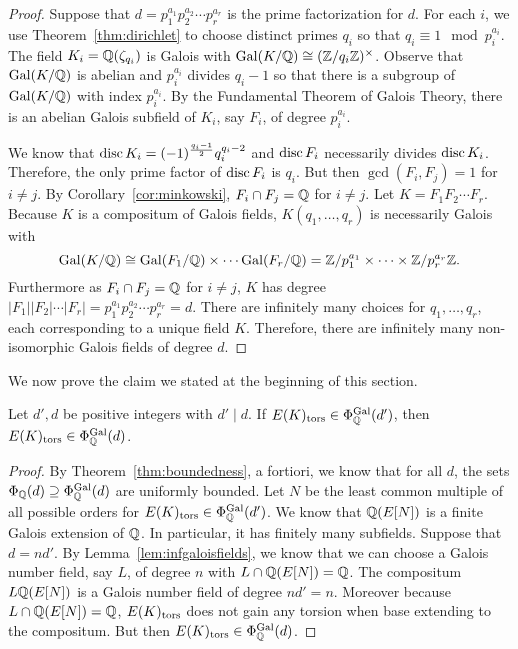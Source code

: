 \begin{proof}
Suppose that $d= p_1^{a_1}p_2^{a_2} \cdots p_r^{a_r}$ is the prime factorization for $d$. For each $i$, we use Theorem~\ref{thm:dirichlet} to choose distinct primes $q_i$ so that $q_i \equiv 1 \mod p_i^{a_i}$. The field $K_i= \mathbb{Q}(\zeta_{q_i})$ is Galois with $\operatorname{Gal}(K/\mathbb{Q}) \cong (\mathbb{Z}/q_i\mathbb{Z})^\times$. Observe that $\operatorname{Gal}(K/\mathbb{Q})$ is abelian and $p_i^{a_i}$ divides $q_i - 1$ so that there is a subgroup of $\operatorname{Gal}(K/\mathbb{Q})$ with index $p_i^{a_i}$. By the Fundamental Theorem of Galois Theory, there is an abelian Galois subfield of $K_i$, say $F_i$, of degree $p_i^{a_i}$. 

We know that $\operatorname{disc} K_i= (-1)^{\frac{q_i-1}{2}} q_i^{q_i - 2}$ and $\operatorname{disc} F_i$ necessarily divides $\operatorname{disc} K_i$. Therefore, the only prime factor of $\operatorname{disc} F_i$ is $q_i$. But then $\gcd(F_i,F_j)= 1$ for $i \neq j$. By Corollary~\ref{cor:minkowski}, $F_i \cap F_j= \mathbb{Q}$ for $i \neq j$. Let $K= F_1F_2\cdots F_r$. Because $K$ is a compositum of Galois fields, $K(q_1,\ldots,q_r)$ is necessarily Galois with 
	\[
	\operatorname{Gal}(K/\mathbb{Q}) \cong \operatorname{Gal}(F_1/\mathbb{Q}) \times \cdots \operatorname{Gal}(F_r/\mathbb{Q})= \mathbb{Z}/p_1^{a_1} \times \cdots \times \mathbb{Z}/p_r^{a_r}\mathbb{Z}.
	\]
Furthermore as $F_i \cap F_j= \mathbb{Q}$ for $i \neq j$, $K$ has degree $|F_1| |F_2| \cdots |F_r|= p_1^{a_1} p_2^{a_2} \cdots p_r^{a_r}= d$. There are infinitely many choices for $q_1,\ldots,q_r$, each corresponding to a unique field $K$. Therefore, there are infinitely many non-isomorphic Galois fields of degree $d$. 
\end{proof}


We now prove the claim we stated at the beginning of this section.


\begin{prop} \label{prop:galoisbaseextend}
Let $d', d$ be positive integers with $d' \mid d$. If $E(K)_{\text{tors}} \in \Phi_{\mathbb{Q}}^{\operatorname{Gal}}(d')$, then $E(K)_{\text{tors}} \in \Phi_{\mathbb{Q}}^{\operatorname{Gal}}(d)$.
\end{prop}

\begin{proof}
By Theorem~\ref{thm:boundedness}, a fortiori, we know that for all $d$, the sets $\Phi_{\mathbb{Q}}(d) \supseteq \Phi_{\mathbb{Q}}^{\operatorname{Gal}}(d)$ are uniformly bounded. Let $N$ be the least common multiple of all possible orders for $E(K)_{\text{tors}} \in \Phi_{\mathbb{Q}}^{\operatorname{Gal}}(d')$. We know that $\mathbb{Q}(E[N])$ is a finite Galois extension of $\mathbb{Q}$. In particular, it has finitely many subfields. Suppose that $d= nd'$. By Lemma~\ref{lem:infgaloisfields}, we know that we can choose a Galois number field, say $L$, of degree $n$ with $L \cap \mathbb{Q}(E[N])= \mathbb{Q}$. The compositum $L\mathbb{Q}(E[N])$ is a Galois number field of degree $nd'= n$. Moreover because $L \cap \mathbb{Q}(E[N])= \mathbb{Q}$, $E(K)_{\text{tors}}$ does not gain any torsion when base extending to the compositum. But then $E(K)_{\text{tors}} \in \Phi_{\mathbb{Q}}^{\operatorname{Gal}}(d)$.
\end{proof}


